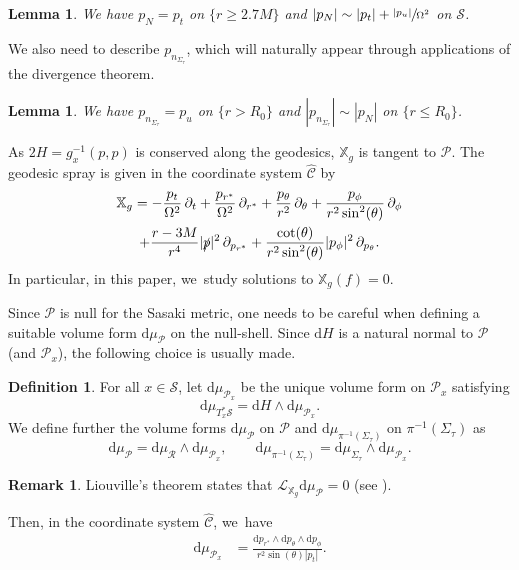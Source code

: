 \documentclass[10pt]{amsart}
\theoremstyle{plain}
\newtheorem{lemma}[proposition]{Lemma}
\theoremstyle{definition}
\newtheorem{definition}[proposition]{Definition}
\newtheorem{remark}[proposition]{Remark}
\newcommand\T{{\mathbb{X}}}
\newcommand\dr{{\mathrm{d}}}
\begin{document}
\begin{lemma}\label{LempN}
We have $p_N=p_t$ on $\{ r \geq 2.7M \}$ and $|p_N| \sim |p_t|+\sfrac{|p_u|}{\Omega^2} $ on $\mathcal{S}$.
\end{lemma}

We also need to describe $p_{n_{\Sigma_\tau}}$, which will naturally appear through applications of the divergence theorem.

\begin{lemma}\label{LempSig}
We have $p_{n_{\Sigma_\tau}}=p_u$ on $\{ r > R_0 \}$ and $|p_{n_{\Sigma_\tau}}| \sim |p_N|$ on $\{ r \leq R_0 \}$.
\end{lemma}

As $2H=g_x^{-1}(p,p)$ is conserved along the geodesics, $\T_g$ is tangent to $\mathcal{P}$. The geodesic spray is given in the coordinate system $\widehat{ \mathscr{C}}$ by
\begin{multline}\label{eq:defT}
\T_g = -\frac{p_t}{\Omega^2} \,\partial_t + \frac{p_{r^*}}{\Omega^2} \,\partial_{r^*}+\frac{p_{\theta}}{r^2} \,\partial_{\theta} + \frac{p_{\phi}}{r^2 \sin^2 (\theta)} \,\partial_{\phi} \\
+ \frac{r-3M}{r^4} |\slashed{p}|^2 \,\partial_{p_{r^*} }+\frac{\cot (\theta)}{r^2 \sin^2 (\theta)} |p_{\phi}|^2 \,\partial_{p_{\theta} }.
\end{multline}
In particular, in this paper, we~study solutions to $\T_g(f)=0$.

Since $\mathcal{P}$ is null for the Sasaki metric, one needs to be careful when defining a suitable volume form $\dr \mu_\mathcal{P}$ on the null-shell. Since $\dr H$ is a natural normal to $\mathcal{P}$ (and $\mathcal{P}_x$), the following choice is usually made.
\begin{definition}
For all $x \in \mathcal{S}$, let $\dr \mu_{\mathcal{P}_x}$ be the unique volume form on $\mathcal{P}_x$ satisfying
\[
\dr \mu_{T^*_x\mathcal{S}} = \dr H \wedge \dr \mu_{\mathcal{P}_x}.
\]
We define further the volume forms $\dr \mu_{\mathcal{P}}$ on $\mathcal{P}$ and $\dr \mu_{\pi^{-1}(\Sigma_\tau)}$ on $\pi^{-1}(\Sigma_\tau)$ as
\[
\dr \mu_{\mathcal{P}} =\dr \mu_{\mathcal{R}} \wedge \dr \mu_{\mathcal{P}_x},\qquad \dr \mu_{\pi^{-1}(\Sigma_\tau)} = \dr \mu_{\Sigma_\tau} \wedge \dr \mu_{\mathcal{P}_x}.
\]
\end{definition}
\begin{remark}\label{RkLiouvi}
Liouville's theorem states that $\mathcal{L}_{\T_g} \dr \mu_{\mathcal{P}}=0$ (see \cite[Th.\,2]{AGS}).
\end{remark}
Then, in the coordinate system $\widehat{\mathscr{C}}$, we~have
\begin{align*}
\dr \mu_{\mathcal{P}_x} & = \frac{\dr p_{r^*} \wedge \dr p_\theta \wedge \dr p_\phi}{r^2 \sin(\theta) |p_t|}.
\end{align*}
\end{document}
